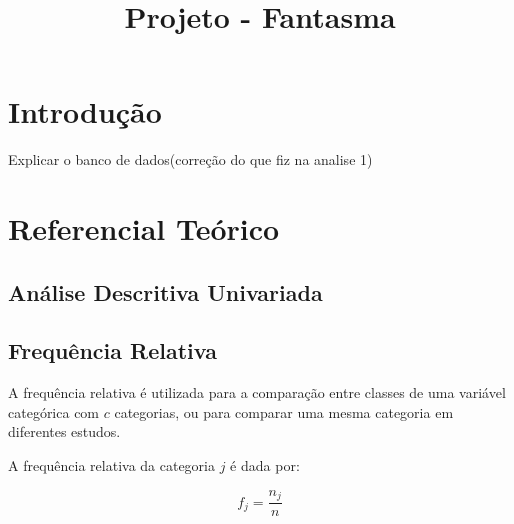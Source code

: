 \documentclass[
]{estat/estat}
\title{Projeto - Fantasma}
\author{}
\date{}
\renewcommand*\contentsname{Índice}
\newcommand\contentsname{Índice}
\begin{document}
\maketitle

\fancyhf{} 

\fancyhead[L]{} %
\renewcommand{\headrulewidth}{0pt}   %

\fancyfoot[R]{\textcolor{white}{\thepage}} %

\pagestyle{fancy} 

\renewcommand*\contentsname{Sumário}
{
\hypersetup{linkcolor=}
\setcounter{tocdepth}{3}
\tableofcontents
}

\section{Introdução}\label{introduuxe7uxe3o}

Explicar o banco de dados(correção do que fiz na analise 1)

\section{Referencial Teórico}\label{referencial-teuxf3rico}

\subsection{Análise Descritiva
Univariada}\label{anuxe1lise-descritiva-univariada}

\subsection{Frequência Relativa}\label{frequuxeancia-relativa}

A frequência relativa é utilizada para a comparação entre classes de uma
variável categórica com \(c\) categorias, ou para comparar uma mesma
categoria em diferentes estudos.

A frequência relativa da categoria \(j\) é dada por:

\[
f_j=\frac{n_j}{n}
\]
\end{document}
